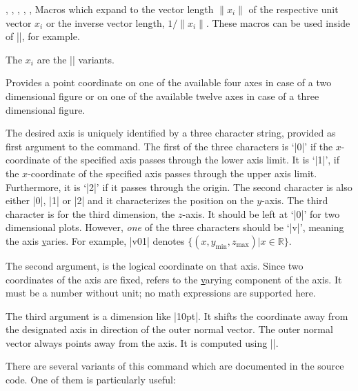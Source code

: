 \begin{commandlist}{%
    \pgfplotsunitxlength,
    \pgfplotsunitylength,
    \pgfplotsunitzlength,
    \pgfplotsunitxinvlength,
    \pgfplotsunityinvlength,
    \pgfplotsunitzinvlength%
}
    Macros which expand to the vector length $\lVert x_i \rVert$ of the
    respective unit vector $x_i$ or the inverse vector length, $1/\lVert x_i
    \rVert$. These macros can be used inside of |\pgfmathparse|, for example.

    The $x_i$ are the |\pgfplotspointunitx| variants.
\end{commandlist}

\begin{command}{\pgfplotsqpointoutsideofaxis%
}
    Provides a point coordinate on one of the available four axes in case of a
    two dimensional figure or on one of the available twelve axes in case of a
    three dimensional figure.

    The desired axis is uniquely identified by a three character string,
    provided as first argument to the command. The first of the three
    characters is `|0|' if the $x$-coordinate of the specified axis passes
    through the lower axis limit. It is `|1|', if the $x$-coordinate of the
    specified axis passes through the upper axis limit. Furthermore, it is
    `|2|' if it passes through the origin. The second character is also either
    |0|, |1| or |2| and it characterizes the position on the $y$-axis. The
    third character is for the third dimension, the $z$-axis. It should be left
    at `|0|' for two dimensional plots. However, \emph{one} of the three
    characters should be `|v|', meaning the axis \underline varies. For
    example, |v01| denotes $\{ (x,y_{\min},z_{\max}) \vert x \in \mathbb{R} \}$.

    The second argument,  is the logical coordinate on that
    axis. Since two coordinates of the axis are fixed,  refers
    to the \underline varying component of the axis. It must be a number
    without unit; no math expressions are supported here.

    The third argument  is a dimension like |10pt|. It
    shifts the coordinate away from the designated axis in direction of the
    outer normal vector. The outer normal vector always points away from the
    axis. It is computed using |\pgfplotspointouternormalvectorofaxis|.

    There are several variants of this command which are documented in the
    source code. One of them is particularly useful:
\end{command}

